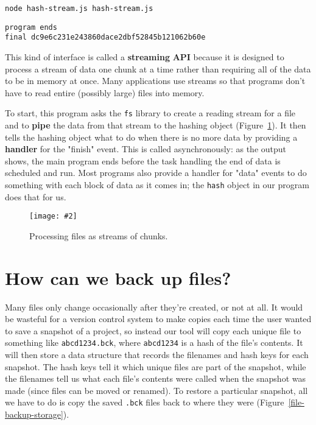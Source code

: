 \documentclass[krantzl]{krantz}
\newcommand{\figpdf}[4]{\begin{figure}%
\centering%
\texttt{[image: \#2]}%
\caption{#3}%
\label{#1}%
\end{figure}}
\newcommand{\figref}[1]{Figure~\ref{#1}}
\newcommand{\glossref}[1]{\textbf{#1}}
\begin{document}
\begin{lstlisting}[frame=single,frameround=tttt]
node hash-stream.js hash-stream.js
\end{lstlisting}



\begin{lstlisting}[frame=single,frameround=tttt]
program ends
final dc9e6c231e243860dace2dbf52845b121062b60e
\end{lstlisting}



\noindent This kind of interface is called
a \glossref{streaming} \glossref{API}
because it is designed to process a stream of data one chunk at a time
rather than requiring all of the data to be in memory at once.
Many applications use streams
so that programs don't have to read entire (possibly large) files into memory.


To start,
this program asks the \texttt{fs} library to create a reading stream for a file
and to \glossref{pipe} the data from that stream to the hashing object
(\figref{file-backup-streaming}).
It then tells the hashing object what to do when there is no more data
by providing a \glossref{handler} for the "finish" event.
This is called asynchronously:
as the output shows,
the main program ends before the task handling the end of data is scheduled and run.
Most programs also provide a handler for "data" events to do something with each block of data as it comes in;
the \texttt{hash} object in our program does that for us.

\figpdf{file-backup-streaming}{./file-backup/streaming.pdf}{Processing files as streams of chunks.}{0.6}

\section{How can we back up files?}\label{file-backup-backup}


Many files only change occasionally after they're created, or not at all.
It would be wasteful for a version control system to make copies
each time the user wanted to save a snapshot of a project,
so instead our tool will copy each unique file to something like \texttt{abcd1234.bck},
where \texttt{abcd1234} is a hash of the file's contents.
It will then store a data structure that records the filenames and hash keys for each snapshot.
The hash keys tell it which unique files are part of the snapshot,
while the filenames tell us what each file's contents were called when the snapshot was made
(since files can be moved or renamed).
To restore a particular snapshot,
all we have to do is copy the saved \texttt{.bck} files back to where they were
(\figref{file-backup-storage}).
\end{document}
